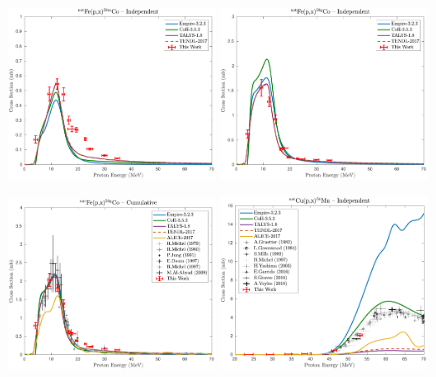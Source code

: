\begin{figure}
 \centering
 \includegraphics[width=0.49\textwidth]{./figures/58mCo.pdf}
 \includegraphics[width=0.49\textwidth]{./figures/58gCo.pdf}
 
 \includegraphics[width=0.49\textwidth]{./figures/58Co.pdf}
 \includegraphics[width=0.49\textwidth]{./figures/54MnCu.pdf}
 

\end{figure}
